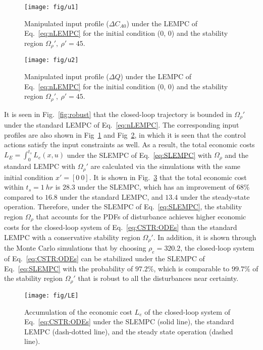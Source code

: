 \documentclass[letterpaper, 10pt, conference]{ieeeconf}
\begin{document}
\begin{figure}[!htbp]
	\centering
	\texttt{[image: fig/u1]}
	\vspace{-8pt}
	\caption{Manipulated input profile ($\Delta C_{A0}$) under the LEMPC of Eq.~\ref{eq:nLEMPC} for the initial condition (0, 0) and the stability region $\Omega_{\rho}',~\rho'=45$.}
	\label{fig:u1}
	\vspace{-6pt}
\end{figure}

\begin{figure}[!htbp]
	\centering
	\texttt{[image: fig/u2]}
	\vspace{-8pt}
	\caption{Manipulated input profile ($\Delta Q$) under the LEMPC of Eq.~\ref{eq:nLEMPC} for the initial condition (0, 0) and the stability region $\Omega_{\rho}',~\rho'=45$.}
	\label{fig:u2}
	\vspace{-6pt}
\end{figure}
  
 It is seen in Fig.~\ref{fig:robust} that the closed-loop trajectory is bounded in $\Omega_{\rho}'$ under the standard LEMPC of Eq.~\ref{eq:nLEMPC}. The corresponding input profiles are also shown in Fig~\ref{fig:u1} and Fig~\ref{fig:u2}, in which it is seen that the control actions satisfy the input constraints as well. As a result, the total economic costs $L_E=\int_{0}^{t_s} L_e(x, u) $ under the SLEMPC of Eq.~\ref{eq:SLEMPC} with $\Omega_{\rho}$ and the standard LEMPC with $\Omega_\rho'$ are calculated via the simulations with the same initial condition $x'=[0 ~0]$. It is shown in Fig.~\ref{fig:LE} that the total economic cost within $t_s=1~hr$ is $28.3$ under the SLEMPC, which has an improvement of $68 \%$ compared to $16.8$ under the standard LEMPC, and $13.4$ under the steady-state operation. Therefore, under the SLEMPC of Eq.~\ref{eq:SLEMPC}, the stability region $\Omega_{\rho}$ that accounts for the PDFs of disturbance achieves higher economic costs for the closed-loop system of Eq.~\ref{eq:CSTR:ODEs} than the standard LEMPC with a conservative stability region $\Omega_{\rho}'$. In addition, it is shown through the Monte Carlo simulations that by choosing $\rho_{e}=320.2$, the closed-loop system of Eq.~\ref{eq:CSTR:ODEs} can be stabilized under the SLEMPC of Eq.~\ref{eq:SLEMPC} with the probability of $97.2 \%$, which is comparable to $99.7 \%$ of the stability region $\Omega_{\rho}'$ that is robust to all the disturbances near certainty. 
 \begin{figure}[!htbp]
	\centering
	\texttt{[image: fig/LE]}
	\vspace{-8pt}
	\caption{Accumulation of the economic cost $L_e$ of the closed-loop system of Eq.~\ref{eq:CSTR:ODEs} under the SLEMPC (solid line), the standard LEMPC (dash-dotted line), and the steady state operation (dashed line).}
	\label{fig:LE}
	\vspace{-6pt}
\end{figure}
\end{document}

